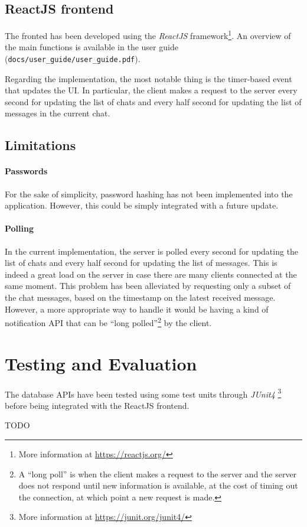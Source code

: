 \documentclass[10pt]{article}
\begin{document}
\subsection{ReactJS frontend}
The fronted has been developed using the \emph{ReactJS} framework\footnote{More
information at \url{https://reactjs.org/}}. An overview of the main functions 
is available in the user guide (\texttt{docs/user\_guide/user\_guide.pdf}).

Regarding the implementation, the most notable thing is the timer-based event
that updates the UI. In particular, the client makes a request to the server
every second for updating the list of chats and every half second for updating 
the list of messages in the current chat.

\subsection{Limitations}
\paragraph{Passwords}
For the sake of simplicity, password hashing has not been implemented into the 
application. However, this could be simply integrated with a future update.

\paragraph{Polling}
In the current implementation, the server is polled every second for updating 
the list of chats and every half second for updating the list of messages. This 
is indeed a great load on the server in case there are many clients connected 
at the same moment. 
This problem has been alleviated by requesting only a subset of the chat 
messages, based on the timestamp on the latest received message.
However, 
a more appropriate way to handle it would be having a kind of notification API
that can be ``long polled''\footnote{A ``long poll'' is when the client 
makes a request to the server and the server does not respond until new 
information is available, at the cost of timing out the connection, at which 
point a new request is made.} by the client.

\section{Testing and Evaluation}

The database APIs have been tested using some test units through \emph{JUnit4}
\footnote{More information at \url{https://junit.org/junit4/}} before being 
integrated with the ReactJS frontend.

TODO
\end{document}
